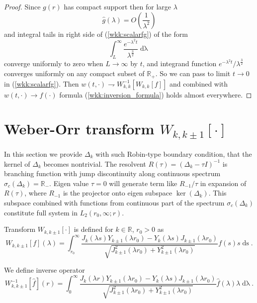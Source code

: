 \documentclass[manuscript, printscheme]{paper}
\newcommand{\RM}{\mathbb{R}}
\newcommand{\ds}{\operatorname{ds}}
\newcommand{\dlambda}{\operatorname{d\lambda}}
\begin{document}
\begin{proof}
Since $g(r)$ has compact support then for large $\lambda$
$$
\hat g(\lambda)=O\left (\frac 1{\lambda^2}  \right )
$$
and integral tails in right side of (\ref{wkk:scalarfg}) of the form
$$
\int_L^\infty \frac{e^{-\lambda^2 t}}{\lambda^\frac 32}\dlambda
$$
converge uniformly to zero when $L\to \infty$  by $t$, and integrand function ${e^{-\lambda^2 t}}/{\lambda^\frac 32}$ converges uniformly on any compact subset of $\RM_+$. So we can pass to limit $t\to 0$ in (\ref{wkk:scalarfg}). Then $w(t,\cdot) \rightharpoondown W^{-1}_{k,k}\left [W_{k,k} [f] \right ]$ and combined with $w(t,\cdot) \rightarrow f(\cdot)$ formula (\ref{wkk:inversion_formula}) holds almost everywhere.

\end{proof}


\section{Weber-Orr transform $W_{k,k\pm 1}[\cdot]$ }

In this section we provide $\Delta_k$ with such Robin-type boundary condition, that the kernel of $\Delta_k$ becomes nontrivial.
The resolvent $R(\tau) = (\Delta_k-\tau I)^{-1}$ is branching function with jump discontinuity along continuous spectrum $\sigma_c(\Delta_k) = \RM_-$. Eigen value $\tau=0$ will generate term like $R_{-1}/\tau$ in expansion of $R(\tau)$, where $R_{-1}$ is the projector onto eigen subspace $\ker(\Delta_k)$. This subspace combined with functions from continuous part of the spectrum $\sigma_c(\Delta_k)$ constitute full system in $L_2(r_0,\infty; r)$.

Transform $W_{k,k\pm 1}[\cdot]$ is defined for $k\in \RM$, $r_0>0$ as
\begin{equation}\label{int:weberorr}
W_{k,k\pm 1}[f](\lambda) = \int_{r_0}^\infty \frac{J_{k}(\lambda s)Y_{k\pm 1}(\lambda r_0) - Y_{k}(\lambda s)J_{k\pm 1}(\lambda r_0)}
{\sqrt{J_{k\pm 1}^2(\lambda r_0) + Y_{k\pm 1}^2(\lambda r_0)}}   f(s) s \ds.
\end{equation}

We define inverse operator
\begin{equation}\label{int:weberorrinv}
W^{-1}_{k,k\pm 1}[\hat f](r) = \int_{0}^\infty \frac  {J_{k}(\lambda r)Y_{k\pm 1}(\lambda r_0) - Y_{k}(\lambda s)J_{k\pm 1}(\lambda r_0)}{\sqrt{J_{k\pm 1}^2(\lambda r_0) + Y_{k\pm 1}^2(\lambda r_0)}} \hat f (\lambda) \lambda \dlambda.
\end{equation}

\end{document}
